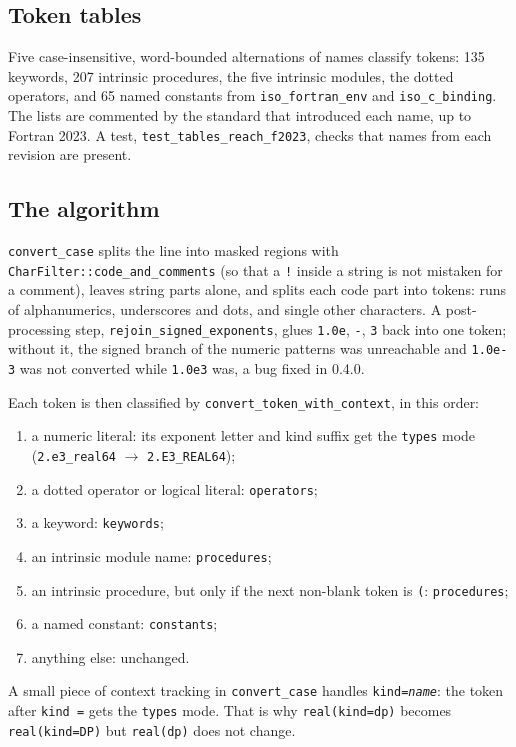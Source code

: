 \documentclass[11pt,a4paper,openany]{book}
\newcommand{\code}[1]{\texttt{\small #1}}
\begin{document}
\subsection{Token tables}

Five case-insensitive, word-bounded alternations of names classify tokens:
135 keywords, 207 intrinsic procedures, the five intrinsic modules, the
dotted operators, and 65 named constants from \code{iso\_fortran\_env} and
\code{iso\_c\_binding}. The lists are commented by the standard that
introduced each name, up to Fortran 2023. A test, \code{test\_tables\_reach\_f2023},
checks that names from each revision are present.

\subsection{The algorithm}

\code{convert\_case} splits the line into masked regions with
\code{CharFilter::code\_and\_comments} (so that a \code{!} inside a string is
not mistaken for a comment), leaves string parts alone, and splits each code part
into tokens: runs of alphanumerics, underscores and dots, and single other
characters. A post-processing step, \code{rejoin\_signed\_exponents}, glues
\code{1.0e}, \code{-}, \code{3} back into one token; without it, the signed
branch of the numeric patterns was unreachable and \code{1.0e-3} was not
converted while \code{1.0e3} was, a bug fixed in 0.4.0.

Each token is then classified by \code{convert\_token\_with\_context}, in this
order:

\begin{enumerate}
  \item a numeric literal: its exponent letter and kind suffix get the
    \code{types} mode (\code{2.e3\_real64} $\to$ \code{2.E3\_REAL64});
  \item a dotted operator or logical literal: \code{operators};
  \item a keyword: \code{keywords};
  \item an intrinsic module name: \code{procedures};
  \item an intrinsic procedure, but only if the next non-blank token is
    \code{(}: \code{procedures};
  \item a named constant: \code{constants};
  \item anything else: unchanged.
\end{enumerate}

A small piece of context tracking in \code{convert\_case} handles
\code{kind=\textit{name}}: the token after \code{kind =} gets the \code{types}
mode. That is why \code{real(kind=dp)} becomes \code{real(kind=DP)} but
\code{real(dp)} does not change.
\end{document}
